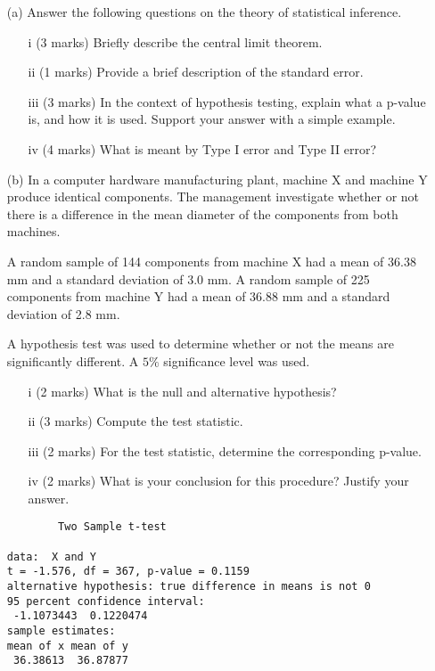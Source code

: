 \begin{itemize}
\item[(a)] Answer the following questions on the theory of statistical inference.
\begin{itemize}
\item[i] (3 marks) Briefly describe the central limit theorem.
\item[ii] (1 marks) Provide a brief description of the standard error.
\item[iii] (3 marks) In the context of hypothesis testing, explain what a p-value is, and how it is used. Support your answer with a simple example.
\item[iv] (4 marks) What is meant by Type I error and Type II error?
\end{itemize}

\bigskip

\item[(b)] In a computer hardware manufacturing plant, machine X and machine Y produce identical components. The management investigate whether or not there is a difference in the mean diameter of the components from both machines.

A random sample of 144 components from machine X had a mean of 36.38 mm and a standard deviation of 3.0 mm.
A random sample of 225 components from machine Y had a mean of 36.88 mm and a standard deviation of 2.8 mm.

A hypothesis test was used to determine whether or not the means are significantly different.
A $5\%$ significance level was used.

\begin{itemize}
\item[i] (2 marks) What is the null and alternative hypothesis?
\item[ii] (3 marks) Compute the test statistic.
\item[iii] (2 marks) For the test statistic, determine the corresponding p-value.
\item[iv] (2 marks) What is your conclusion for this procedure? Justify your answer.
\end{itemize}
\begin{framed}
\begin{verbatim}
        Two Sample t-test

data:  X and Y
t = -1.576, df = 367, p-value = 0.1159
alternative hypothesis: true difference in means is not 0
95 percent confidence interval:
 -1.1073443  0.1220474
sample estimates:
mean of x mean of y
 36.38613  36.87877
\end{verbatim}
\end{framed}
\end{itemize}





